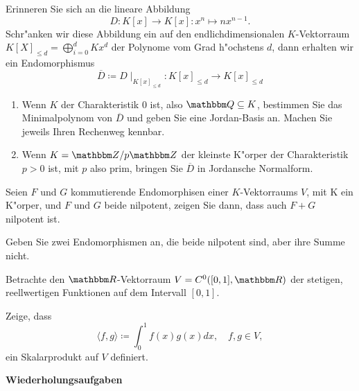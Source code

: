 \documentclass[a4,11pt]{article}
\begin{document}
\vspace*{-17mm}
{
\kopf
}


\begin{aufgabe}[4 Punkte]

Erinneren Sie sich an die lineare Abbildung
\[
D : K[x] \rightarrow K[x] : x^n \mapsto nx^{n-1}.
\]
Schr"anken wir diese Abbildung ein auf den endlichdimensionalen $K$-Vektorraum $K[X]_{\leq d} = \bigoplus_{i = 0}^d Kx^d$ der Polynome vom Grad h"ochstens $d$, dann erhalten wir ein Endomorphismus
\[
\overline{D} \coloneqq D\mid_{K[x]_{\leq d}} : K[x]_{\leq d} \rightarrow K[x]_{\leq d}
\]
  
\begin{enumerate}
\item Wenn $K$ der Charakteristik $0$ ist, also $\Q \subseteq K$, bestimmen Sie das Minimalpolynom von $\overline{D}$ und geben Sie eine Jordan-Basis an. Machen Sie jeweils Ihren Rechenweg kennbar.
\item Wenn $K = \Z/p\Z$ der kleinste K"orper der Charakteristik $p > 0$ ist, mit $p$ also prim, bringen Sie $\overline{D}$ in Jordansche Normalform.
\end{enumerate}

\end{aufgabe}

\begin{aufgabe}[4 Punkte]

Seien $F$ und $G$ kommutierende Endomorphisen einer $K$-Vektorraums $V$, mit K ein K"orper, und $F$ und $G$ beide nilpotent, zeigen Sie dann, dass auch $F+G$ nilpotent ist.

Geben Sie zwei Endomorphismen an, die beide nilpotent sind, aber ihre Summe nicht.

\end{aufgabe}


\begin{aufgabe}[4 Punkte]
Betrachte den $\R$-Vektorraum $V=C^0([0,1],\R)$ der stetigen,
reellwertigen Funktionen auf dem Intervall $[0,1]$.

Zeige, dass
$$
\langle f,g \rangle \coloneqq \int_0^1 f(x)g(x) dx, \quad f,g \in V,
$$
ein Skalarprodukt auf $V$ definiert.

\end{aufgabe}

\newpage
\bigskip
{\Large \bfseries Wiederholungsaufgaben}
\bigskip
\end{document}
